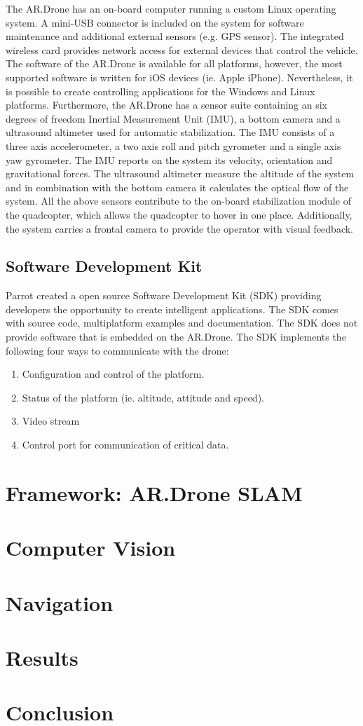 \documentclass[a4paper]{article}
\begin{document}
The AR.Drone has an on-board computer running a custom Linux operating system. A mini-USB connector is included on the system for software maintenance and additional external sensors (e.g. GPS sensor). The integrated wireless card provides network access for external devices that control the vehicle. The software of the AR.Drone is available for all platforms, however, the most supported software is written for iOS devices (ie. Apple iPhone). Nevertheless, it is possible to create controlling applications for the Windows and Linux platforms. Furthermore, the AR.Drone has a sensor suite containing an six degrees of freedom Inertial Measurement Unit (IMU), a bottom camera and a ultrasound altimeter used for automatic stabilization. The IMU consists of a three axis accelerometer, a two axis roll and pitch gyrometer and a single axis yaw gyrometer. The IMU reports on the system its velocity, orientation and gravitational forces. The ultrasound altimeter measure the altitude of the system and in combination with the bottom camera it calculates the optical flow of the system. All the above sensors contribute to the on-board stabilization module of the quadcopter, which allows the quadcopter to hover in one place. Additionally, the system carries a frontal camera to provide the operator with visual feedback.

\subsection{Software Development Kit}
Parrot created a open source Software Development Kit (SDK) providing developers the opportunity to create intelligent applications. The SDK comes with source code, multiplatform examples and documentation. The SDK does not provide software that is embedded on the AR.Drone. The SDK implements the following four ways to communicate with the drone:
\begin{enumerate}
\item Configuration and control of the platform.
\item Status of the platform (ie. altitude, attitude and speed).
\item Video stream
\item Control port for communication of critical data.
\end{enumerate}

\section{Framework: AR.Drone SLAM}

\section{Computer Vision}

\section{Navigation}

\section{Results}

\section{Conclusion}
\end{document}
